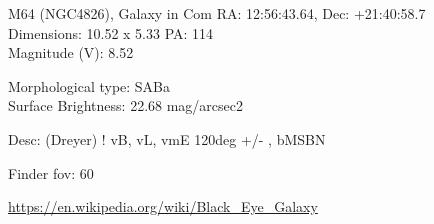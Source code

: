 \begin{block}{M64 (NGC4826), Galaxy in Com}
    RA: 12:56:43.64, Dec: +21:40:58.7 \\ 
    Dimensions: 10.52 x 5.33 PA: 114 \\ 
    Magnitude (V): 8.52

    Morphological type: SABa \\ 
    Surface Brightness: 22.68 mag/arcsec2 

    Desc: (Dreyer) ! vB, vL, vmE 120deg +/- , bMSBN 

    Finder fov: 60 

    \url{https://en.wikipedia.org/wiki/Black_Eye_Galaxy} 
\end{block}